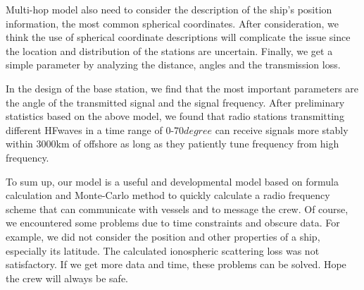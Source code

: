 \documentclass{mcmthesis}
\begin{document}
  Multi-hop model also need to consider the description of the ship's position information, the most common spherical coordinates. After consideration, we think the use of spherical coordinate descriptions will complicate the issue since the location and distribution of the stations are uncertain. Finally, we get a simple parameter by analyzing the distance, angles and the transmission loss.

  In the design of the base station, we find that the most important parameters are the angle of the transmitted signal and the signal frequency. After preliminary statistics based on the above model, we found that radio stations transmitting different HFwaves in a time range of 0-70$degree$ can receive signals more stably within 3000km of offshore as long as they patiently tune frequency from high frequency.

  To sum up, our model is a useful and developmental model based on formula calculation and Monte-Carlo method to quickly calculate a radio frequency scheme that can communicate with vessels and to message the crew. Of course, we encountered some problems due to time constraints and obscure data. For example, we did not consider the position and other properties of a ship, especially its latitude. The calculated ionospheric scattering loss was not satisfactory. If we get more data and time, these problems can be solved. Hope the crew will always be safe.




\newpage
%
%



\end{document}
